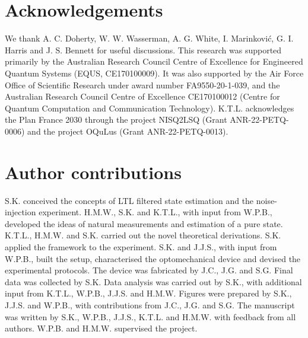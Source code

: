 \documentclass[aps,prx,twocolumn,amsmath,amssymb,superscriptaddress,floatfix,longbibliography
]{revtex4-2}
\begin{document}

\section*{Acknowledgements}

\noindent
We thank A. C. Doherty, W. W. Wasserman, A. G. White, I. Marinković, G. I. Harris and J. S. Bennett for useful discussions. This research was supported primarily by the Australian Research Council Centre of Excellence for Engineered Quantum Systems (EQUS, CE170100009). It was also supported by the Air Force Office of Scientific Research under award number FA9550-20-1-039, and the Australian Research Council Centre of Excellence CE170100012 (Centre for Quantum Computation and Communication Technology). K.T.L. acknowledges the Plan France 2030 through the project NISQ2LSQ (Grant ANR-22-PETQ-0006) and the project OQuLus (Grant ANR-22-PETQ-0013).

\section*{Author contributions}
\noindent
S.K. conceived the concepts of LTL filtered state estimation and the noise-injection experiment. H.M.W., S.K. and K.T.L., with input from W.P.B., developed the ideas of natural measurements and estimation of a pure state. K.T.L., H.M.W. and S.K. carried out the novel theoretical derivations. S.K. applied the framework to the experiment. S.K. and J.J.S., with input from W.P.B., built the setup, characterised the optomechanical device and devised the experimental protocols. The device was fabricated by J.C., J.G. and S.G. Final data was collected by S.K. Data analysis was carried out by S.K., with additional input from K.T.L., W.P.B., J.J.S. and H.M.W. Figures were prepared by S.K., J.J.S. and W.P.B., with contributions from J.C., J.G. and S.G. The manuscript was written by S.K., W.P.B., J.J.S., K.T.L. and H.M.W. with feedback from all authors. W.P.B. and H.M.W. supervised the project.
\end{document}
